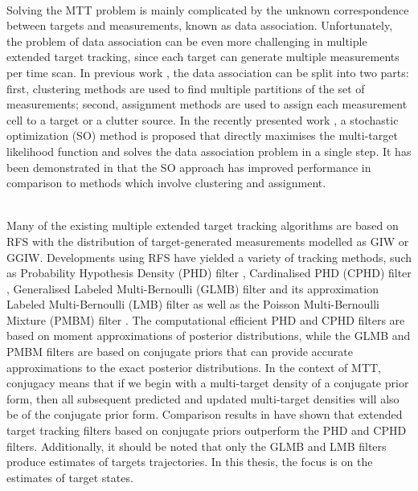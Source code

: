 ~\\
Solving the MTT problem is mainly complicated by the unknown correspondence between targets and measurements, known as data association. Unfortunately, the problem of data association can be even more challenging in multiple extended target tracking, since each target can generate multiple measurements per time scan. In previous work \cite{phdextended,pmbmextended,pmbmextended2}, the data association can be split into two parts: first, clustering methods are used to find multiple partitions of the set of measurements; second, assignment methods are used to assign each measurement cell to a target or a clutter source. In the recently presented work \cite{soextended}, a stochastic optimization (SO) method is proposed that directly maximises the multi-target likelihood function and solves the data association problem in a single step. It has been demonstrated in \cite{soextended} that the SO approach has improved performance in comparison to methods which involve clustering and assignment. 

~\\
Many of the existing multiple extended target tracking algorithms are based on RFS with the distribution of target-generated measurements modelled as GIW or GGIW. Developments using RFS have yielded a variety of tracking methods, such as Probability Hypothesis Density (PHD) filter \cite{phdextended2,phdextended3}, Cardinalised PHD (CPHD) filter \cite{cphdextended}, Generalised Labeled Multi-Bernoulli (GLMB) filter \cite{lmbextended} and its approximation Labeled Multi-Bernoulli (LMB) filter \cite{lmbextended} as well as the Poisson Multi-Bernoulli Mixture (PMBM) filter \cite{pmbmextended,pmbmextended2}. The computational efficient PHD and CPHD filters are based on moment approximations of posterior distributions, while the GLMB and PMBM filters are based on conjugate priors that can provide accurate approximations to the exact posterior distributions. In the context of MTT, conjugacy means that if we begin with a multi-target density of a conjugate prior form, then all subsequent predicted and updated multi-target densities will also be of the conjugate prior form. Comparison results in \cite{pmbmextended,lmbextended} have shown that extended target tracking filters based on conjugate priors outperform the PHD and CPHD filters. Additionally, it should be noted that only the GLMB and LMB filters produce estimates of targets trajectories. In this thesis, the focus is on the estimates of target states.

